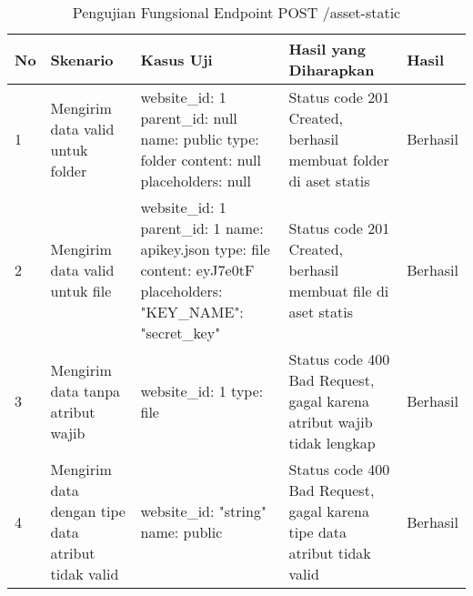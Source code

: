 \begin{table}[H]
    \centering
    \begin{tabular}{|p{0.5cm}|p{3cm}|p{5cm}|p{5cm}|p{1.5cm}|}
        \hline
        \rowcolor[HTML]{DAE8FC} 
        \textbf{No} & \textbf{Skenario} & \textbf{Kasus Uji} & \textbf{Hasil yang Diharapkan} & \textbf{Hasil} \\ \hline
        1 & Mengirim data valid untuk folder & 
        website\_id: 1 \newline parent\_id: null \newline name: public \newline type: folder \newline content: null \newline placeholders: null & 
        Status code 201 Created, berhasil membuat folder di aset statis & 
        Berhasil \\ \hline
        2 & Mengirim data valid untuk file & 
        website\_id: 1 \newline parent\_id: 1 \newline name: apikey.json \newline type: file \newline content: eyJ7e0tF \newline placeholders: {"KEY\_NAME": "secret\_key"} & 
        Status code 201 Created, berhasil membuat file di aset statis & 
        Berhasil \\ \hline
        3 & Mengirim data tanpa atribut wajib & 
        website\_id: 1 \newline type: file & 
        Status code 400 Bad Request, gagal karena atribut wajib tidak lengkap & 
        Berhasil \\ \hline
        4 & Mengirim data dengan tipe data atribut tidak valid & 
        website\_id: "string" \newline name: public & 
        Status code 400 Bad Request, gagal karena tipe data atribut tidak valid & 
        Berhasil \\ \hline
    \end{tabular}
    \caption{Pengujian Fungsional Endpoint POST /asset-static}
    \label{tab:asset_static_post_testing}
\end{table}
